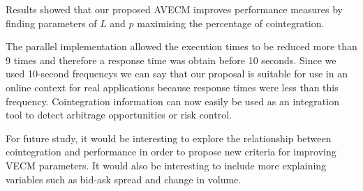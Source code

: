 Results showed that our proposed AVECM improves performance measures by finding
parameters of $L$ and $p$ maximising the percentage of cointegration. 

The parallel implementation allowed the execution times to be reduced more than
9 times and therefore a response time was obtain before 10 seconds. Since we
used 10-second frequencys we can say that our proposal is suitable for use in an
online context for real applications because response times were less than this
frequency. Cointegration information can now easily be used as an integration tool
to detect arbitrage opportunities or risk control.

For future study, it would be interesting to explore the relationship between
cointegration and performance in order to propose new criteria for improving
VECM parameters. It would also be interesting to include more explaining
variables such as bid-ask spread and change in volume.

